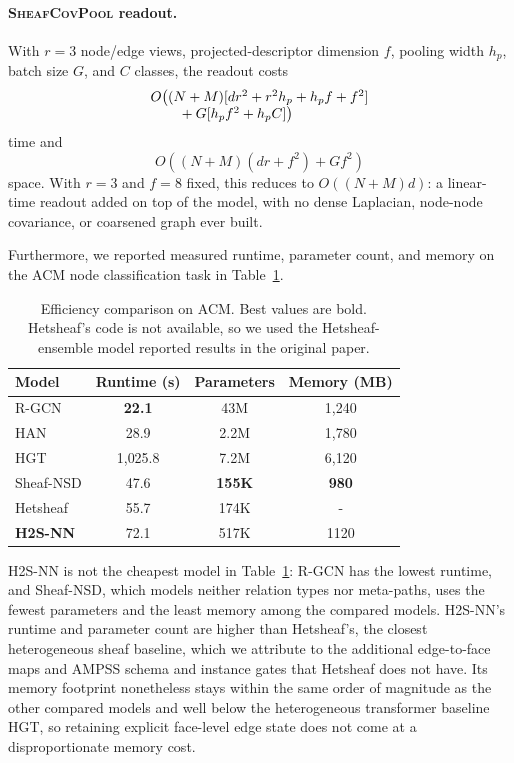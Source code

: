 \documentclass[sigconf,anonymous,review]{acmart}
\newcommand{\method}{\textsc{H2S-NN}}
\newcommand{\ampss}{\textsc{AMPSS}}
\newcommand{\sheafcovpool}{\textsc{SheafCovPool}}
\begin{document}
\paragraph{\sheafcovpool{} readout.} With $r=3$ node/edge views, projected-descriptor
dimension $f$, pooling width $h_p$, batch size $G$, and $C$ classes, the readout costs
\[
\begin{array}{@{}l@{}}
O\bigl((N+M)[dr^2+r^2h_p+h_pf+f^2] \\
\qquad{}+G[h_pf^2+h_pC]\bigr)
\end{array}
\]
time and
\[
O\!\left((N+M)(dr+f^2)+Gf^2\right)
\]
space. With $r=3$ and $f=8$ fixed, this reduces to $O((N+M)d)$: a linear-time readout
added on top of the model, with no dense Laplacian, node-node covariance, or coarsened graph
ever built.

Furthermore, we reported measured runtime, parameter count, and memory on the ACM node
classification task in Table~\ref{tab:efficiency}.

\begin{table}[H]
  \centering
  \caption{Efficiency comparison on ACM. Best values are bold. Hetsheaf's code is not available, so we used the Hetsheaf-ensemble model reported results in the original paper.}
  \label{tab:efficiency}
  \scriptsize
  \begin{tabular}{lccc}
    \toprule
    \textbf{Model} & Runtime (s) & Parameters & Memory (MB) \\
    \midrule
    R-GCN & \textbf{22.1} & 43M & 1{,}240 \\
    HAN & 28.9 & 2.2M & 1{,}780 \\
    HGT & 1{,}025.8 & 7.2M & 6{,}120 \\
    Sheaf-NSD & 47.6 & \textbf{155K} & \textbf{980} \\
    Hetsheaf & 55.7 & 174K & - \\
    \midrule
    \textbf{\method{}} & 72.1 & 517K & 1120 \\
    \bottomrule
  \end{tabular}
\end{table}

\method{} is not the cheapest model in Table~\ref{tab:efficiency}: R-GCN has the lowest runtime,
and Sheaf-NSD, which models neither relation types nor meta-paths, uses the fewest parameters and
the least memory among the compared models. \method{}'s runtime and parameter count are higher
than Hetsheaf's, the closest heterogeneous sheaf baseline, which we attribute to the additional
edge-to-face maps and \ampss{} schema and instance gates that Hetsheaf does not have. Its memory
footprint nonetheless stays within the same order of magnitude as the other compared models and
well below the heterogeneous transformer baseline HGT, so retaining explicit face-level edge state
does not come at a disproportionate memory cost.
\end{document}
